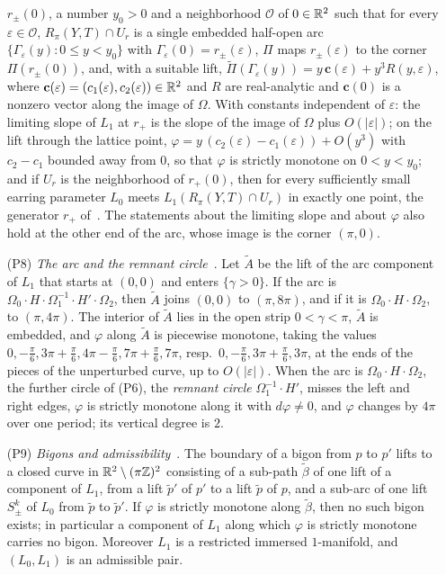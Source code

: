 \begin{enumerate}
$r_\pm(0)$, a number $y_0>0$ and a neighborhood $\mathcal O$ of $0\in\R^2$ such that for every $\varepsilon\in\mathcal O$,
$R_\pi(Y,T)\cap U_r$ is a single embedded half-open arc $\{\Gamma_\varepsilon(y):0\le y<y_0\}$ with $\Gamma_\varepsilon(0)=r_\pm(\varepsilon)$,
$\Pi$ maps $r_\pm(\varepsilon)$ to the corner $\Pi(r_\pm(0))$, and, with a suitable lift,
$\widetilde\Pi(\Gamma_\varepsilon(y))=y\,\mathbf c(\varepsilon)+y^3R(y,\varepsilon)$, where $\mathbf c(\varepsilon)=(c_1(\varepsilon),c_2(\varepsilon))\in\R^2$ and $R$ are real-analytic and $\mathbf c(0)$ is a nonzero vector along the image of $\Omega$. With constants independent of $\varepsilon$: the limiting slope of
$L_1$ at $r_+$ is the slope of the image of $\Omega$ plus $O(|\varepsilon|)$; on the lift through the lattice point,
$\varphi=y\,(c_2(\varepsilon)-c_1(\varepsilon))+O(y^3)$ with $c_2-c_1$ bounded away from $0$, so that $\varphi$ is strictly monotone
on $0<y<y_0$; and if $U_r$ is the neighborhood of $r_+(0)$, then for every sufficiently small earring parameter $L_0$
meets $L_1(R_\pi(Y,T)\cap U_r)$ in exactly one point, the generator $r_+$ of~\cite[Lemma~5.1]{HHK2}. The statements about the limiting slope and about $\varphi$ also hold at the other end of the arc, whose image is the corner $(\pi,0)$.
\item[(P8)] \emph{The arc and the remnant circle}~\cite[\S6.1, Lemmas~6.1 and~6.2]{WuebbenV}. Let $\tilde A$ be the lift
of the arc component of $L_1$ that starts at $(0,0)$ and enters $\{\gamma>0\}$. If the arc is
$\Omega_0\cdot H\cdot\Omega_1^{-1}\cdot H'\cdot\Omega_2$, then $\tilde A$ joins $(0,0)$ to $(\pi,8\pi)$, and if it is
$\Omega_0\cdot H\cdot\Omega_2$, to $(\pi,4\pi)$. The interior of $\tilde A$ lies in the open strip $0<\gamma<\pi$, $\tilde A$ is
embedded, and $\varphi$ along $\tilde A$ is piecewise monotone, taking the values
$0,-\frac\pi6,3\pi+\frac\pi6,4\pi-\frac\pi6,7\pi+\frac\pi6,7\pi$, resp.\ $0,-\frac\pi6,3\pi+\frac\pi6,3\pi$, at the ends of the
pieces of the unperturbed curve, up to $O(|\varepsilon|)$. When the arc is $\Omega_0\cdot H\cdot\Omega_2$, the further circle
of (P6), the \emph{remnant circle} $\Omega_1^{-1}\cdot H'$, misses the left and right edges, $\varphi$ is strictly monotone along it with
$d\varphi\neq0$, and $\varphi$ changes by $4\pi$ over one period; its vertical degree is $2$.
\item[(P9)] \emph{Bigons and admissibility}~\cite[Lemmas~6.4 and~6.6]{WuebbenV}. The boundary of a bigon from $p$ to $p'$
lifts to a closed curve in $\mathbb{R}^2\setminus(\pi\mathbb{Z})^2$ consisting of a sub-path $\tilde\beta$ of one lift of a component of
$L_1$, from a lift $\tilde p'$ of $p'$ to a lift $\tilde p$ of $p$, and a sub-arc of one lift $S^k_\pm$ of $L_0$ from $\tilde p$
to $\tilde p'$. If $\varphi$ is strictly monotone along $\tilde\beta$, then no such bigon exists; in particular a component of
$L_1$ along which $\varphi$ is strictly monotone carries no bigon. Moreover $L_1$ is a restricted immersed
$1$-manifold, and $(L_0,L_1)$ is an admissible pair.
\end{enumerate}
